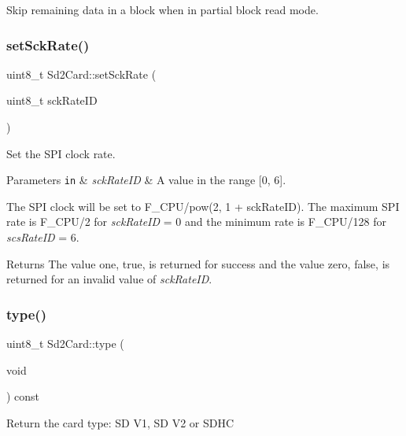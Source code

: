 Skip remaining data in a block when in partial block read mode. \mbox{\label{class_sd2_card_ad849b8896de9abd4e24bd98f4204ccc4}} 
\subsubsection{\texorpdfstring{set\+Sck\+Rate()}{setSckRate()}}
{\footnotesize\ttfamily uint8\+\_\+t Sd2\+Card\+::set\+Sck\+Rate (\begin{DoxyParamCaption}\item[{uint8\+\_\+t}]{sck\+Rate\+ID }\end{DoxyParamCaption})}

Set the S\+PI clock rate.


\begin{DoxyParams}[1]{Parameters}
\mbox{\tt in}  & {\em sck\+Rate\+ID} & A value in the range \mbox{[}0, 6\mbox{]}.\\
\hline
\end{DoxyParams}
The S\+PI clock will be set to F\+\_\+\+C\+P\+U/pow(2, 1 + sck\+Rate\+ID). The maximum S\+PI rate is F\+\_\+\+C\+P\+U/2 for {\itshape sck\+Rate\+ID} = 0 and the minimum rate is F\+\_\+\+C\+P\+U/128 for {\itshape scs\+Rate\+ID} = 6.

\begin{DoxyReturn}{Returns}
The value one, true, is returned for success and the value zero, false, is returned for an invalid value of {\itshape sck\+Rate\+ID}. 
\end{DoxyReturn}
\mbox{\label{class_sd2_card_acaaebba61c53eb3925457c563f56bb1a}} 
\subsubsection{\texorpdfstring{type()}{type()}}
{\footnotesize\ttfamily uint8\+\_\+t Sd2\+Card\+::type (\begin{DoxyParamCaption}\item[{void}]{ }\end{DoxyParamCaption}) const\hspace{0.3cm}{\ttfamily [inline]}}

Return the card type\+: SD V1, SD V2 or S\+D\+HC \mbox{\label{class_sd2_card_ae9bdd6cff43b8b694584f9bae7e781b0}} 
